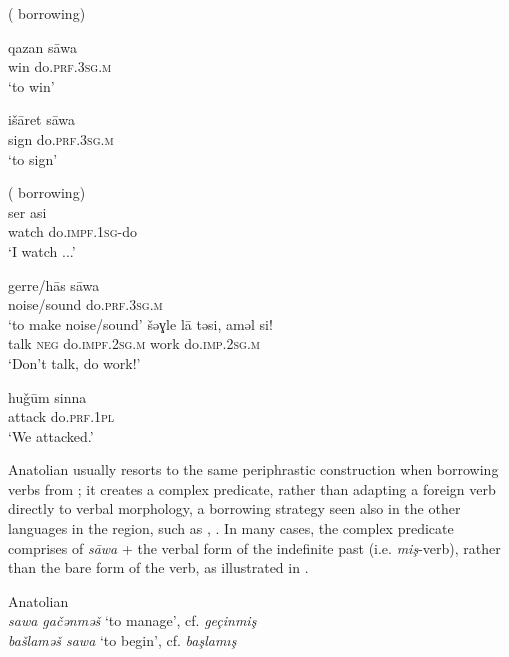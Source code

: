 \documentclass[output=paper]{langsci/langscibook}
\begin{document}
\begin{exe}
\ex \label{l}   ( borrowing)
		\begin{xlist}
			\ex \label{ltk2} \gll qazan 	s\={a}wa  \\
        win	do.\textsc{prf.3sg.m}\\
        \glt `to win'

		\ex \label{ltk1}\gll išāret s\={a}wa \\
    sign  do.\textsc{prf.3sg.m}\\
        \glt `to sign'
		\end{xlist}
      \ex \label{l3}   ( borrowing) \\
      \gll ser asi \\
        watch do.\textsc{impf.1sg}-do\\
        \glt `I watch ...'
        \ex \label{lar}   \\
		\begin{xlist}
		\ex \gll gerre/h\={a}s s\={a}wa\\
    noise/sound do.\textsc{prf.3sg.m}\\
        \glt `to make noise/sound'
	\ex \label{lar2} \gll šəɣle l\={a} təsi, aməl si!  \\
      talk \textsc{neg} do.\textsc{impf.2sg.m} work do.\textsc{imp.2sg.m}\\
        \glt `Don't talk, do work!'

        \ex \label{lar3}\gll hu\v{g}ūm sinna \\
    attack  do.\textsc{prf.1pl}\\
        \glt `We attacked.'
		\end{xlist}
\end{exe}

\noindent Anatolian  usually resorts to the same periphrastic construction when borrowing verbs from ; it creates a complex predicate, rather than adapting a foreign verb directly to  verbal morphology, a borrowing strategy seen also in the other languages in the region, such as , . In many cases, the complex predicate comprises of \textit{s\={a}wa} + the  verbal form of the indefinite past (i.e. \textit{mi\c{s}}-verb), rather than the bare form of the verb, as illustrated in .

\ea \label{turkverb} Anatolian  \citep[184]{Talay2007}\\
\noindent \textit{sawa gačənməš} `to manage', cf.  \textit{geçinmiş}\\
\textit{ba\v{s}lamə\v{s} sawa} `to begin',  cf.  \textit{başlamış} \\
\z
\end{document}
